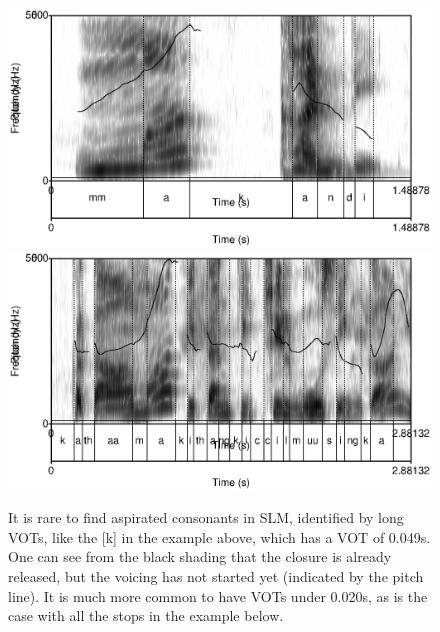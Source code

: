 \begin{figure}
 \centering
 \includegraphics[height=0.3\textheight]{./pics/mmakandi-asp.eps}
 \includegraphics[height=0.3\textheight]{./pics/kathaamakiccilmuusingka.eps}

 \caption[VOT of rare aspirated /k/ and comparison with the normal, non-aspirated case.]{It is rare to find aspirated consonants in SLM, identified by long VOTs, like the [k] in  the example above, which has a VOT of 0.049s. One can see from the black shading that the closure is already released, but the voicing has not started yet (indicated by the pitch line).
It is much more common to have VOTs under 0.020s, as is the case with all the stops in the example below.}
 \label{fig:phon:vot:mmakang-asp}
\end{figure}

